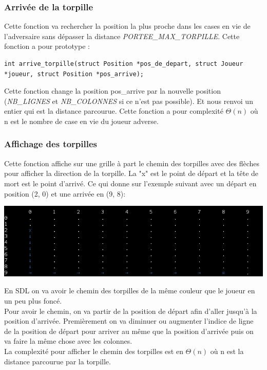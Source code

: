 \subsubsection{Arrivée de la torpille}
Cette fonction va rechercher la position la plus proche dans les cases en vie de l'adversaire sans dépasser la distance {\textit{PORTEE\_MAX\_TORPILLE}}. Cette fonction a pour prototype :
\begin{lstlisting}
int arrive_torpille(struct Position *pos_de_depart, struct Joueur *joueur, struct Position *pos_arrive);
\end{lstlisting}
Cette fonction change la position pos\_arrive par la nouvelle position ({\textit{NB\_LIGNES}} et {\textit{NB\_COLONNES}} si ce n'est pas possible). Et nous renvoi un entier qui est la distance parcourue. Cette fonction a pour complexité $\Theta(n)$ où n est le nombre de case en vie du joueur adverse.\\
\subsubsection{Affichage des torpilles}
Cette fonction affiche sur une grille à part le chemin des torpilles avec des flèches pour afficher la direction de la torpille. La "x" est le point de départ et la tête de mort est le point d'arrivé. Ce qui donne sur l'exemple suivant avec un départ en position (2, 0) et une arrivée en (9, 8):\\
\begin{center}
\includegraphics[scale=0.75]{./image/chemin_torpille.png}\\
\end{center}
En SDL on va avoir le chemin des torpilles de la même couleur que le joueur en un peu plus foncé.\\
Pour avoir le chemin, on va partir de la position de départ afin d'aller jusqu'à la position d'arrivée. Premièrement on va diminuer ou augmenter l'indice de ligne de la position de départ pour arriver au même que la position d'arrivée puis on va faire la même chose avec les colonnes.\\
La complexité pour afficher le chemin des torpilles est en $\Theta(n)$ où n est la distance parcourue par la torpille.
